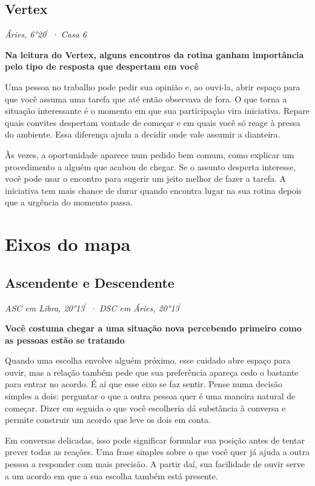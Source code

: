 \documentclass[11pt,a4paper]{article}
\newcommand{\leitura}[3]{\subsection{#1}\textit{#2}\par #3}
\newcommand{\subtituloleitura}[1]{\textbf{#1}\par\nopagebreak[4]}
\begin{document}
\leitura{Vertex}{Áries, 6°20\ensuremath{^{\prime}} · Casa 6}{
\subtituloleitura{Na leitura do Vertex, alguns encontros da rotina ganham importância pelo tipo de resposta que despertam em você} Uma pessoa no trabalho pode pedir sua opinião e, ao ouvi-la, abrir espaço para que você assuma uma tarefa que até então observava de fora. O que torna a situação interessante é o momento em que sua participação vira iniciativa. Repare quais convites despertam vontade de começar e em quais você só reage à pressa do ambiente. Essa diferença ajuda a decidir onde vale assumir a dianteira.

Às vezes, a oportunidade aparece num pedido bem comum, como explicar um procedimento a alguém que acabou de chegar. Se o assunto desperta interesse, você pode usar o encontro para sugerir um jeito melhor de fazer a tarefa. A iniciativa tem mais chance de durar quando encontra lugar na sua rotina depois que a urgência do momento passa.
}

\section{Eixos do mapa}

\leitura{Ascendente e Descendente}{ASC em Libra, 20°13\ensuremath{^{\prime}} · DSC em Áries, 20°13\ensuremath{^{\prime}}}{
\subtituloleitura{Você costuma chegar a uma situação nova percebendo primeiro como as pessoas estão se tratando} Quando uma escolha envolve alguém próximo, esse cuidado abre espaço para ouvir, mas a relação também pede que sua preferência apareça cedo o bastante para entrar no acordo. É aí que esse eixo se faz sentir. Pense numa decisão simples a dois: perguntar o que a outra pessoa quer é uma maneira natural de começar. Dizer em seguida o que você escolheria dá substância à conversa e permite construir um acordo que leve os dois em conta.

Em conversas delicadas, isso pode significar formular sua posição antes de tentar prever todas as reações. Uma frase simples sobre o que você quer já ajuda a outra pessoa a responder com mais precisão. A partir daí, sua facilidade de ouvir serve a um acordo em que a sua escolha também está presente.
}
\end{document}
